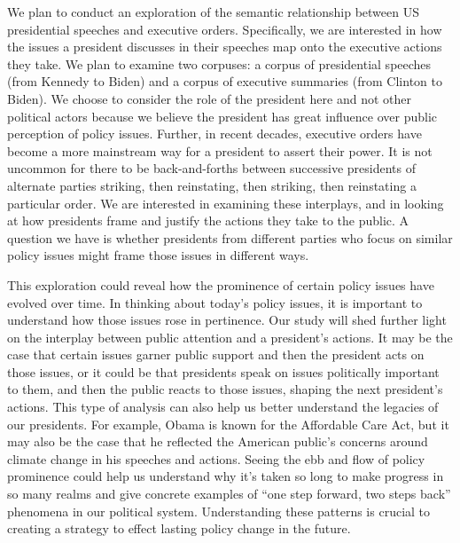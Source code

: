 \documentclass{article}
\begin{document}
{We plan to conduct an exploration of the semantic relationship between US presidential speeches and executive orders. Specifically, we are interested in how the issues a president discusses in their speeches map onto the executive actions they take. We plan to examine two corpuses: a corpus of presidential speeches (from Kennedy to Biden) and a corpus of executive summaries (from Clinton to Biden). We choose to consider the role of the president here and not other political actors because we believe the president has great influence over public perception of policy issues. Further, in recent decades, executive orders have become a more mainstream way for a president to assert their power. It is not uncommon for there to be back-and-forths between successive presidents of alternate parties striking, then reinstating, then striking, then reinstating a particular order. We are interested in examining these interplays, and in looking at how presidents frame and justify the actions they take to the public. A question we have is whether presidents from different parties who focus on similar policy issues might frame those issues in different ways.

This exploration could reveal how the prominence of certain policy issues have evolved over time. In thinking about today’s policy issues, it is important to understand how those issues rose in pertinence. Our study will shed further light on the interplay between public attention and a president’s actions. It may be the case that certain issues garner public support and then the president acts on those issues, or it could be that presidents speak on issues politically important to them, and then the public reacts to those issues, shaping the next president’s actions. This type of analysis can also help us better understand the legacies of our presidents. For example, Obama is known for the Affordable Care Act, but it may also be the case that he reflected the American public’s concerns around climate change in his speeches and actions. Seeing the ebb and flow of policy prominence could help us understand why it’s taken so long to make progress in so many realms and give concrete examples of “one step forward, two steps back” phenomena in our political system. Understanding these patterns is crucial to creating a strategy to effect lasting policy change in the future.

}
\end{document}
